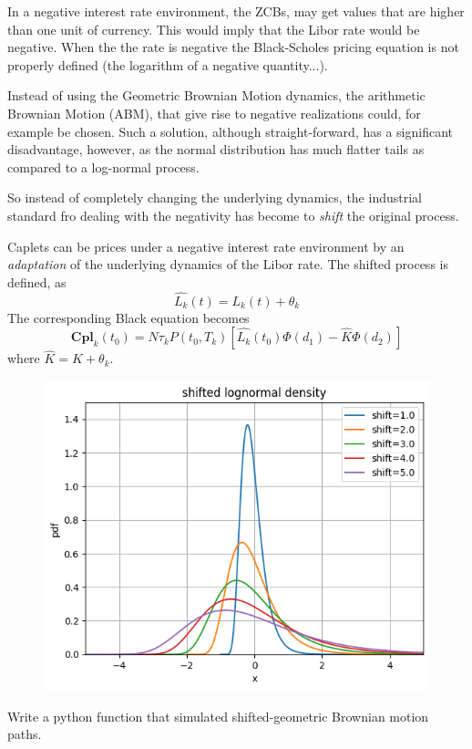\documentclass[12pt,a4paper]{article}
\begin{document}
In a negative interest rate environment, the ZCBs, may get values that are higher than one unit of currency. This would imply that the Libor rate would be negative. When the the rate is negative the Black-Scholes pricing equation is not properly defined (the logarithm of a negative quantity...).

Instead of using the Geometric Brownian Motion dynamics, the arithmetic Brownian Motion (ABM), that give rise to negative realizations could, for example be chosen. Such a solution, although straight-forward, has a significant disadvantage, however, as the normal distribution has much flatter tails as compared to a log-normal process.

So instead of completely changing the underlying dynamics, the industrial standard fro dealing with the negativity has become to \emph{shift} the original process.

Caplets can be prices under a negative interest rate environment by an \emph{adaptation} of the underlying dynamics of the Libor rate. The shifted process is defined, as
\begin{equation}
\hat{L_k}(t) = L_k(t) + \theta_k
\end{equation}
The corresponding Black equation becomes
\begin{equation}
	\textbf{Cpl}_k(t_0) = N\tau_k P(t_0, T_k)\left[\hat{L_k}(t_0)\Phi(d_1)-\hat{K}\Phi(d_2)\right] 
\end{equation}
where $\hat{K} = K + \theta_k$.

\begin{figure}[htbp]
\begin{center}
	\includegraphics[width=0.6\linewidth]{addons/lognormal_shifted}
\end{center}
\label{fig:lognormal_shifted}
\end{figure}

\begin{question}
Write a python function that simulated shifted-geometric Brownian motion paths.
\end{question}
\end{document}
